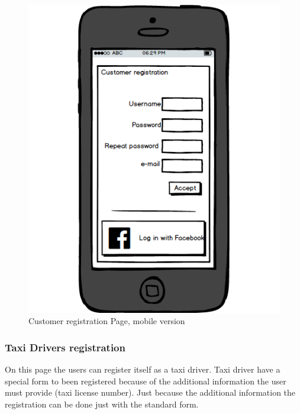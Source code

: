 				\begin{figure}[H]
					\centering
					\includegraphics[scale=0.4]{IMG/UserInterfaces/CustomerRegistration_m.png}
					\caption{Customer registration Page, mobile version}\label{cregistration_m}
				\end{figure}
			
			\subsubsection{Taxi Drivers registration}
			On this page the users can register itself as a taxi driver. Taxi driver have a special form to been registered because of the additional information the user must provide (taxi license number). Just because the additional information the registration can be done just with the standard form.
				
